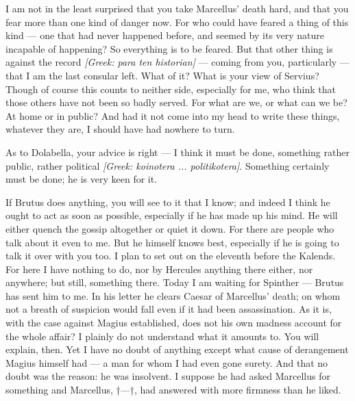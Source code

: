 

 I am not in the least surprised that you take Marcellus' death hard, and that you fear more than one kind of danger now. For who could have feared a thing of this kind --- one that had never happened before, and seemed by its very nature incapable of happening? So everything is to be feared. But that other thing is against the record \textit{[Greek: para ten historian]} --- coming from you, particularly --- that I am the last consular left. What of it? What is your view of Servius? Though of course this counts to neither side, especially for me, who think that those others have not been so badly served. For what are we, or what can we be? At home or in public? And had it not come into my head to write these things, whatever they are, I should have had nowhere to turn.

 As to Dolabella, your advice is right --- I think it must be done, something rather public, rather political \textit{[Greek: koinotera ... politikotera]}. Something certainly must be done; he is very keen for it.

 If Brutus does anything, you will see to it that I know; and indeed I think he ought to act as soon as possible, especially if he has made up his mind. He will either quench the gossip altogether or quiet it down. For there are people who talk about it even to me. But he himself knows best, especially if he is going to talk it over with you too. I plan to set out on the eleventh before the Kalends. For here I have nothing to do, nor by Hercules anything there either, nor anywhere; but still, something there. Today I am waiting for Spinther --- Brutus has sent him to me. In his letter he clears Caesar of Marcellus' death; on whom not a breath of suspicion would fall even if it had been assassination. As it is, with the case against Magius established, does not his own madness account for the whole affair? I plainly do not understand what it amounts to. You will explain, then. Yet I have no doubt of anything except what cause of derangement Magius himself had --- a man for whom I had even gone surety. And that no doubt was the reason: he was insolvent. I suppose he had asked Marcellus for something and Marcellus, †---†, had answered with more firmness than he liked.
